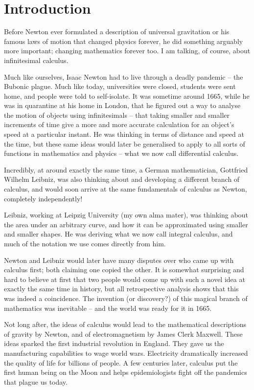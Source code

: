 \documentclass[../main]{subfiles}
\begin{document}
\chapter{Introduction}
Before Newton ever formulated a description of universal gravitation 
or his famous laws of motion that changed physics forever, 
he did something arguably more important; changing mathematics forever too. 
I am talking, of course, about infinitesimal calculus.

Much like ourselves, Isaac Newton had to live through a deadly pandemic – 
the Bubonic plague. Much like today, universities were closed, 
students were sent home, and people were told to self-isolate. 
It was sometime around 1665, 
while he was in quarantine at his home in London, that he 
figured out a way to analyse the motion of objects using infinitesimals – 
that taking smaller and smaller increments of time give a more and more 
accurate calculation for an object’s speed at a particular instant. 
He was thinking in terms of distance and speed at the time, 
but these same ideas would later be generalised to apply to all sorts of 
functions in mathematics and physics – what we now call 
differential calculus.

Incredibly, at around exactly the same time, a German mathematician, 
Gottfried Wilhelm Leibniz, was also thinking about and developing 
a different branch of calculus, and would soon arrive at the same 
fundamentals of calculus as Newton, completely independently!

Leibniz, working at Leipzig University (my own alma mater), 
was thinking about the area under an arbitrary curve, 
and how it can be approximated using smaller and smaller shapes. 
He was deriving what we now call integral calculus, 
and much of the notation we use comes directly from him.

Newton and Leibniz would later have many disputes 
over who came up with calculus first; both claiming one copied the other. 
It is somewhat surprising and hard to believe at first that 
two people would come up with such a novel idea at exactly the same time 
in history, but all retrospective analysis shows that this was indeed a 
coincidence. The invention (or discovery?) of this magical branch 
of mathematics was inevitable – and the world was ready for it in 1665.

Not long after, the ideas of calculus would lead to 
the mathematical descriptions of gravity by Newton, 
and of electromagnetism by James Clerk Maxwell. 
These ideas sparked the first industrial revolution in England. 
They gave us the manufacturing capabilities to wage world wars. 
Electricity dramatically increased the quality of life for 
billions of people. A few centuries later, 
calculus put the first human being on the Moon and 
helps epidemiologists fight off the pandemics that plague us today.
\end{document}
